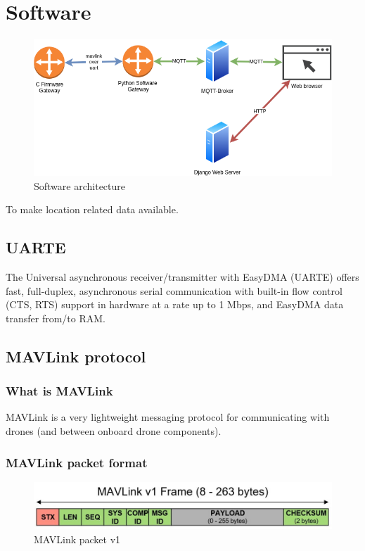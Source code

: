 \documentclass[\main/main.tex]{subfiles}
\begin{document}
\graphicspath{{img/}{05_software/img/}}

\chapter{Software}
\begin{figure}[H]
    \begin{center}
        \includegraphics[scale=0.6]{software_architecture.png}
    \end{center}
    \caption{Software architecture}
    \label{fig:software_architecture}
\end{figure}

To make location related data available.

\section{UARTE}
The Universal asynchronous receiver/transmitter with EasyDMA (UARTE) offers fast, full-duplex, asynchronous serial communication with built-in flow control (CTS, RTS) support in hardware at a rate up to 1 Mbps, and EasyDMA data transfer from/to RAM.
\cite{nordic_semiconductor:nRF52832_PS_v1.4}

\section{MAVLink protocol}

\subsection*{What is MAVLink}
MAVLink is a very lightweight messaging protocol for communicating with drones (and between onboard drone components). \cite{web_mavlink}

\subsection*{MAVLink packet format}
\begin{figure}[H]
    \begin{center}
        \includegraphics[scale=1.2]{packet_mavlink_v1.jpg}
    \end{center}
    \caption{MAVLink packet v1}
    \label{fig:packet_mavlink_v1}
\end{figure}
\end{document}
